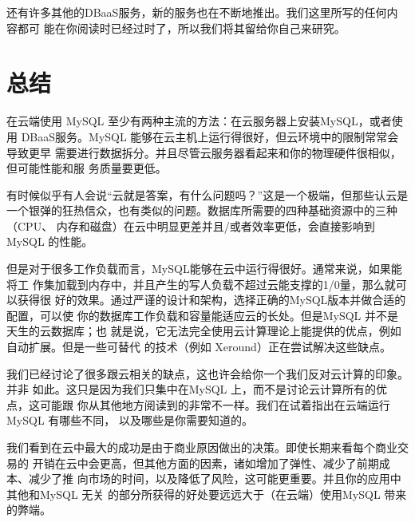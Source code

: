 还有许多其他的DBaaS服务，新的服务也在不断地推出。我们这里所写的任何内容都可
能在你阅读时已经过时了，所以我们将其留给你自己来研究。

\section{总结}
在云端使用 MySQL 至少有两种主流的方法：在云服务器上安装MySQL，或者使用
DBaaS服务。MySQL 能够在云主机上运行得很好，但云环境中的限制常常会导致更早
需要进行数据拆分。并且尽管云服务器看起来和你的物理硬件很相似，但可能性能和服
务质量要更低。

有时候似乎有人会说“云就是答案，有什么问题吗？”这是一个极端，但那些认云是
一个银弹的狂热信众，也有类似的问题。数据库所需要的四种基础资源中的三种（CPU、
内存和磁盘）在云中明显更差并且/或者效率更低，会直接影响到 MySQL 的性能。

但是对于很多工作负载而言，MySQL能够在云中运行得很好。通常来说，如果能将工
作集加载到内存中，并且产生的写人负载不超过云能支撑的1/0量，那么就可以获得很
好的效果。通过严谨的设计和架构，选择正确的MySQL版本并做合适的配置，可以使
你的数据库工作负载和容量能适应云的长处。但是MySQL 并不是天生的云数据库；也
就是说，它无法完全使用云计算理论上能提供的优点，例如自动扩展。但是一些可替代
的技术（例如 Xeround）正在尝试解决这些缺点。

我们已经讨论了很多跟云相关的缺点，这也许会给你一个我们反对云计算的印象。并非
如此。这只是因为我们只集中在MySQL 上，而不是讨论云计算所有的优点，这可能跟
你从其他地方阅读到的非常不一样。我们在试着指出在云端运行 MySQL 有哪些不同，
以及哪些是你需要知道的。

我们看到在云中最大的成功是由于商业原因做出的决策。即使长期来看每个商业交易的
开销在云中会更高，但其他方面的因素，诸如增加了弹性、减少了前期成本、减少了推
向市场的时间，以及降低了风险，这可能更重要。并且你的应用中其他和MySQL 无关
的部分所获得的好处要远远大于（在云端）使用MySQL 带来的弊端。


